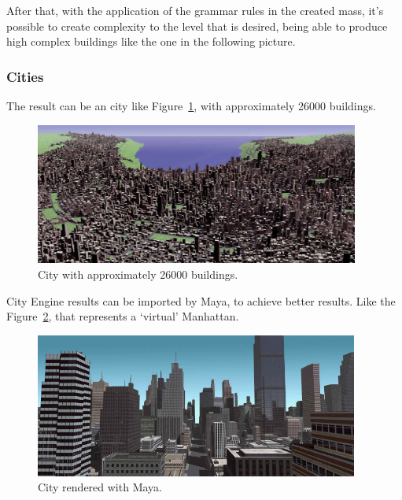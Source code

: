 After that, with the application of the grammar rules in the created mass, it's possible to create complexity to the level that is desired, being able to produce high complex buildings like the one in the following picture.


\subsubsection{Cities} %
\label{ssub:Cities1}

The result can be an city like Figure~\ref{fig:bigCity}, with approximately 26000 buildings.

\begin{figure}[htbp]
  \centering
  \includegraphics[width=0.95\textwidth]{img/Procedural-Modeling-of-Cities/City.png}
  \caption{City with approximately 26000 buildings.}
  \label{fig:bigCity}
\end{figure}

City Engine results can be imported by Maya, to achieve better results. Like the Figure~\ref{fig:cityMaya}, that represents a ‘virtual’ Manhattan.

\begin{figure}[htbp]
  \centering
  \includegraphics[width=0.95\textwidth]{img/Procedural-Modeling-of-Cities/City_Maya.png}
  \caption{City rendered with Maya.}
  \label{fig:cityMaya}
\end{figure}

